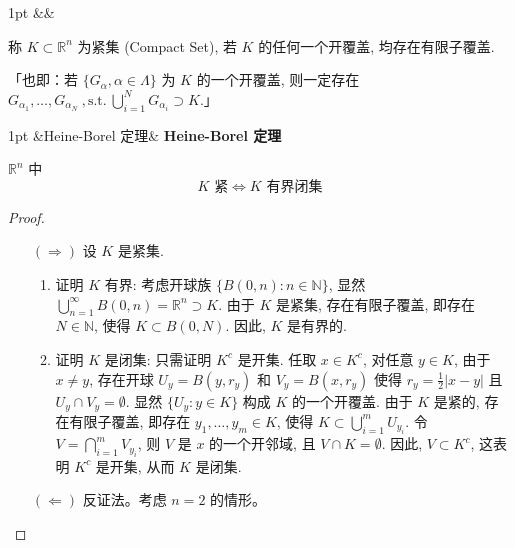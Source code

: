 \documentclass[a4paper]{article}
\newcommand{\st}{,\text{s.t.}}
\newenvironment{formal}[1][]{%
\def\FrameCommand{%
\hspace{1pt}%
{\color{formalline}\vrule width 2pt}%
{\color{formalshade}\vrule width 4pt}%
\colorbox{formalshade}%
}%
\MakeFramed{\advance\hsize-\width\FrameRestore}%
\noindent
\hspace{-4.55pt}%
\begin{adjustwidth}{}{1pt}%
\setlength{\parindent}{0pt}%
\vspace{3pt}%
\ifx&#1&\else %
\textbf{#1}\par
\vspace{1pt}%
\fi }{%
\vspace{2pt}%
\end{adjustwidth}\endMakeFramed%
}
\newenvironment{theorem}[1][]{%
\def\FrameCommand{%
\hspace{1pt}%
{\color{theoremline}\vrule width 2pt}%
{\color{theoremshade}\vrule width 4pt}%
\colorbox{theoremshade}%
}%
\MakeFramed{\advance\hsize-\width\FrameRestore}%
\noindent
\hspace{-4.55pt}%
\begin{adjustwidth}{}{1pt}%
\setlength{\parindent}{0pt}%
\vspace{3pt}%
\ifx&#1&\else %
\textbf{#1}\par
\vspace{1pt}%
\fi }{%
\vspace{2pt}%
\end{adjustwidth}\endMakeFramed%
}
\begin{document}
    \begin{formal}
        [紧集] 称 $K \subset \mathbb{R}^{n}$ 为紧集 (Compact Set), 若 $K$
        的任何一个开覆盖, 均存在有限子覆盖.

        「也即：若 $\{G_{\alpha}, \alpha \in \Lambda\}$ 为 $K$ 的一个开覆盖,
        则一定存在
        $G_{\alpha_1}, \dots, G_{\alpha_N}\ \st \ \bigcup_{i=1}^{N}G_{\alpha_i}\supset
        K$.」
    \end{formal}

    \begin{theorem}[Heine-Borel 定理]
        $\mathbb{R}^{n}$ 中
        \[
            K \text{ 紧}\iff K \text{ 有界闭集}
        \]
    \end{theorem}

    \begin{proof}[Proof]
        \begin{itemize}
            \item[$(\Longrightarrow)$] 设 $K$ 是紧集.

                \begin{enumerate}
                    \item 证明 $K$ 有界: 考虑开球族
                        $\{B(0, n) : n \in \mathbb{N}\}$, 显然 $\bigcup_{n=1}^{\infty}
                        B(0, n) = \mathbb{R}^{n}\supset K$. 由于 $K$ 是紧集, 存在有限子覆盖,
                        即存在 $N \in \mathbb{N}$, 使得 $K \subset B(0, N)$.
                        因此, $K$ 是有界的.

                    \item 证明 $K$ 是闭集: 只需证明 $K^{c}$ 是开集. 任取 $x \in K
                        ^{c}$, 对任意 $y \in K$, 由于 $x \ne y$, 存在开球
                        $U_{y}= B(y, r_{y})$ 和 $V_{y}= B(x, r_{y})$ 使得
                        $r_{y}= \frac{1}{2}|x - y|$ 且
                        $U_{y}\cap V_{y}= \emptyset$. 显然 $\{U_{y}: y \in K\}$ 构成
                        $K$ 的一个开覆盖. 由于 $K$ 是紧的, 存在有限子覆盖,
                        即存在 $y_{1}, \dots, y_{m}\in K$, 使得 $K \subset \bigcup
                        _{i=1}^{m}U_{y_i}$. 令 $V = \bigcap_{i=1}^{m}V_{y_i}$, 则
                        $V$ 是 $x$ 的一个开邻域, 且 $V \cap K = \emptyset$. 因此,
                        $V \subset K^{c}$, 这表明 $K^{c}$ 是开集, 从而 $K$
                        是闭集.
                \end{enumerate}

            \item[$(\Longleftarrow)$] 反证法。考虑 $n = 2$ 的情形。


\end{itemize}
\end{proof}
\end{document}
